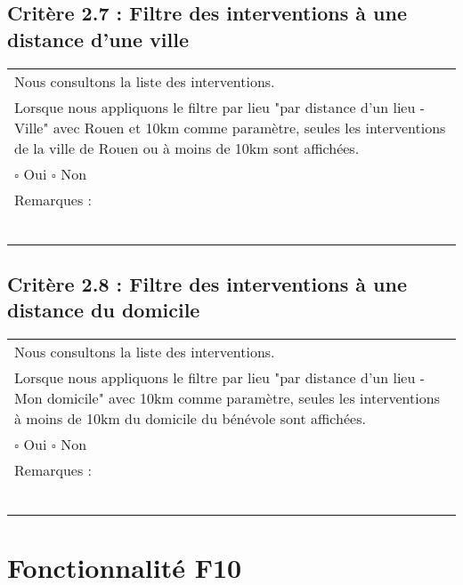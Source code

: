   	\subsection*{Critère 2.7 : Filtre des interventions à une distance d'une ville}
  		\begin{center}
    	 		\begin{tabular}[h]{|p{}|}
			\hline
				Nous consultons la liste des interventions. \\
				Lorsque nous appliquons le filtre par lieu "par distance d'un lieu - Ville" avec Rouen et 10km comme paramètre, seules les interventions de la ville de Rouen ou à moins de 10km sont affichées. \\
						
				$\square$ Oui  \hfill \hfill $\square$ Non \\\hline Remarques : \\ ~\\
			 \\\hline
     		\end{tabular}
  		\end{center}	
  		
  	\subsection*{Critère 2.8 : Filtre des interventions à une distance du domicile}
  		\begin{center}
    	 		\begin{tabular}[h]{|p{}|}
			\hline
				Nous consultons la liste des interventions. \\
				Lorsque nous appliquons le filtre par lieu "par distance d'un lieu - Mon domicile" avec 10km comme paramètre, seules les interventions à moins de 10km du domicile du bénévole sont affichées. \\
						
				$\square$ Oui  \hfill \hfill $\square$ Non \\\hline Remarques : \\ ~\\
			 \\\hline
     		\end{tabular}
  		\end{center}	
  		
  		
\section{Fonctionnalité F10}
